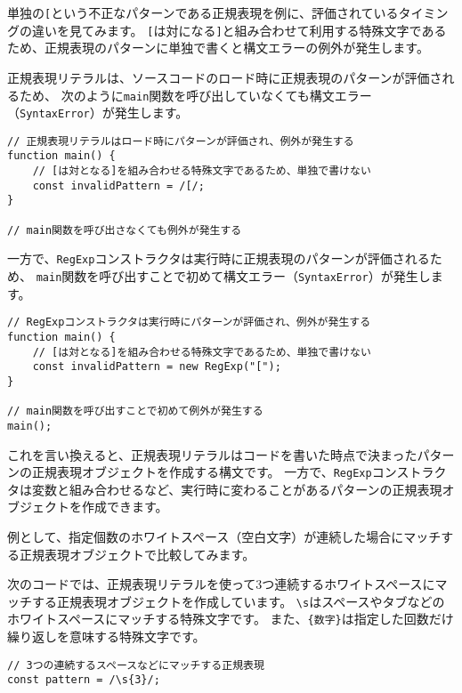 単独の\texttt{[}という不正なパターンである正規表現を例に、評価されているタイミングの違いを見てみます。
\texttt{[}は対になる\texttt{]}と組み合わせて利用する特殊文字であるため、正規表現のパターンに単独で書くと構文エラーの例外が発生します。

正規表現リテラルは、ソースコードのロード時に正規表現のパターンが評価されるため、
次のように\texttt{main}関数を呼び出していなくても構文エラー（\texttt{SyntaxError}）が発生します。

\begin{lstlisting}
// 正規表現リテラルはロード時にパターンが評価され、例外が発生する
function main() {
    // [は対となる]を組み合わせる特殊文字であるため、単独で書けない
    const invalidPattern = /[/;
}

// main関数を呼び出さなくても例外が発生する
\end{lstlisting}

一方で、\texttt{RegExp}コンストラクタは実行時に正規表現のパターンが評価されるため、
\texttt{main}関数を呼び出すことで初めて構文エラー（\texttt{SyntaxError}）が発生します。

\begin{lstlisting}
// RegExpコンストラクタは実行時にパターンが評価され、例外が発生する
function main() {
    // [は対となる]を組み合わせる特殊文字であるため、単独で書けない
    const invalidPattern = new RegExp("[");
}

// main関数を呼び出すことで初めて例外が発生する
main();
\end{lstlisting}

これを言い換えると、正規表現リテラルはコードを書いた時点で決まったパターンの正規表現オブジェクトを作成する構文です。
一方で、\texttt{RegExp}コンストラクタは変数と組み合わせるなど、実行時に変わることがあるパターンの正規表現オブジェクトを作成できます。

例として、指定個数のホワイトスペース（空白文字）が連続した場合にマッチする正規表現オブジェクトで比較してみます。

次のコードでは、正規表現リテラルを使って3つ連続するホワイトスペースにマッチする正規表現オブジェクトを作成しています。
\texttt{\textbackslash s}はスペースやタブなどのホワイトスペースにマッチする特殊文字です。
また、\texttt{\{数字\}}は指定した回数だけ繰り返しを意味する特殊文字です。

\begin{lstlisting}
// 3つの連続するスペースなどにマッチする正規表現
const pattern = /\s{3}/;
\end{lstlisting}

